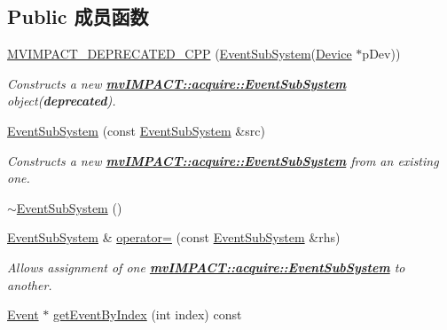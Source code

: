 \subsection*{Public 成员函数}
\begin{DoxyCompactItemize}
\item 
\hyperlink{classmv_i_m_p_a_c_t_1_1acquire_1_1_event_sub_system_a89aef19fe3be239f2280f65d865dd32a}{M\+V\+I\+M\+P\+A\+C\+T\+\_\+\+D\+E\+P\+R\+E\+C\+A\+T\+E\+D\+\_\+\+C\+P\+P} (\hyperlink{classmv_i_m_p_a_c_t_1_1acquire_1_1_event_sub_system}{Event\+Sub\+System}(\hyperlink{classmv_i_m_p_a_c_t_1_1acquire_1_1_device}{Device} $\ast$p\+Dev))
\begin{DoxyCompactList}\small\item\em Constructs a new {\bfseries \hyperlink{classmv_i_m_p_a_c_t_1_1acquire_1_1_event_sub_system}{mv\+I\+M\+P\+A\+C\+T\+::acquire\+::\+Event\+Sub\+System}} object({\bfseries deprecated}). \end{DoxyCompactList}\item 
\hyperlink{group___device_specific_interface_gadb3fa35ca8658058536b71acba5934bf}{Event\+Sub\+System} (const \hyperlink{classmv_i_m_p_a_c_t_1_1acquire_1_1_event_sub_system}{Event\+Sub\+System} \&src)
\begin{DoxyCompactList}\small\item\em Constructs a new {\bfseries \hyperlink{classmv_i_m_p_a_c_t_1_1acquire_1_1_event_sub_system}{mv\+I\+M\+P\+A\+C\+T\+::acquire\+::\+Event\+Sub\+System}} from an existing one. \end{DoxyCompactList}\item 
\hyperlink{classmv_i_m_p_a_c_t_1_1acquire_1_1_event_sub_system_a69d2a064b0b7c16861e7512491af81e7}{$\sim$\+Event\+Sub\+System} ()
\item 
\hyperlink{classmv_i_m_p_a_c_t_1_1acquire_1_1_event_sub_system}{Event\+Sub\+System} \& \hyperlink{classmv_i_m_p_a_c_t_1_1acquire_1_1_event_sub_system_a3f60f59e43ab58f591f73d871778d6b1}{operator=} (const \hyperlink{classmv_i_m_p_a_c_t_1_1acquire_1_1_event_sub_system}{Event\+Sub\+System} \&rhs)
\begin{DoxyCompactList}\small\item\em Allows assignment of one {\bfseries \hyperlink{classmv_i_m_p_a_c_t_1_1acquire_1_1_event_sub_system}{mv\+I\+M\+P\+A\+C\+T\+::acquire\+::\+Event\+Sub\+System}} to another. \end{DoxyCompactList}\item 
\hyperlink{classmv_i_m_p_a_c_t_1_1acquire_1_1_event}{Event} $\ast$ \hyperlink{classmv_i_m_p_a_c_t_1_1acquire_1_1_event_sub_system_a523c894cbe15b257cf14ec3050e88919}{get\+Event\+By\+Index} (int index) const 

\end{DoxyCompactItemize}
